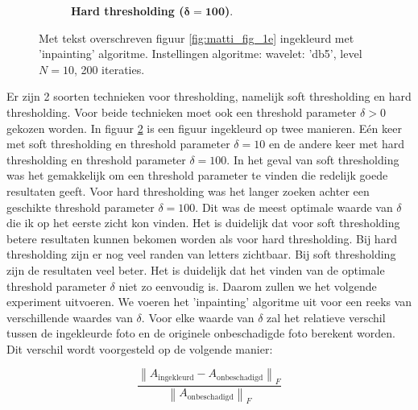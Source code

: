 \begin{figure}[!]
\begin{subfigure}[b]{0.45\textwidth}
        \caption{ \textbf{Hard thresholding ($\mathbf{\delta = 100 }$)}.}
        \label{fig:matti_hard_2}
    \end{subfigure}
    \caption{Met tekst overschreven figuur \ref{fig:matti_fig_1e} ingekleurd met 'inpainting' algoritme. Instellingen algoritme: wavelet: 'db5', level $N = 10$, 200 iteraties.}\label{fig:matti_hardsoft}
\end{figure}



Er zijn 2 soorten technieken voor thresholding, namelijk soft thresholding en hard thresholding. Voor beide technieken moet ook een threshold parameter $\delta > 0$ gekozen worden. In figuur \ref{fig:matti_hardsoft} is een figuur ingekleurd op twee manieren. E\'{e}n keer met soft thresholding en threshold parameter $\delta = 10$ en de andere keer met hard thresholding en threshold parameter $\delta = 100$. In het geval van soft thresholding was het gemakkelijk om een threshold parameter te vinden die redelijk goede resultaten geeft. Voor hard thresholding was het langer zoeken achter een geschikte threshold parameter $\delta = 100$. Dit was de meest optimale waarde van $\delta$ die ik op het eerste zicht kon vinden. Het is duidelijk dat voor soft thresholding betere resultaten kunnen bekomen worden als voor hard thresholding. Bij hard thresholding zijn er nog veel randen van letters zichtbaar. Bij soft thresholding zijn de resultaten veel beter. 
\newline
\newline
Het is duidelijk dat het vinden van de optimale threshold parameter $\delta$ niet zo eenvoudig is. Daarom zullen we het volgende experiment uitvoeren. We voeren het 'inpainting' algoritme uit voor een reeks van verschillende waardes van $\delta$. Voor elke waarde van $\delta$ zal het relatieve verschil tussen de ingekleurde foto en de originele onbeschadigde foto berekent worden. Dit verschil wordt voorgesteld op de volgende manier:

\begin{equation} \label{eq:matti_eq1}
\frac{\left\lVert A_{\text{ingekleurd}} - A_{\text{onbeschadigd}} \right\rVert_{F}}{\left\lVert A_{\text{onbeschadigd}} \right\rVert_{F}}
\end{equation}

